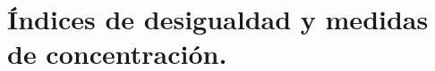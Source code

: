 \chapter[\'Indices de desigualdad y medidas de concentraci\'on.]{\'Indices de desigualdad y medidas de concentraci\'on.}




